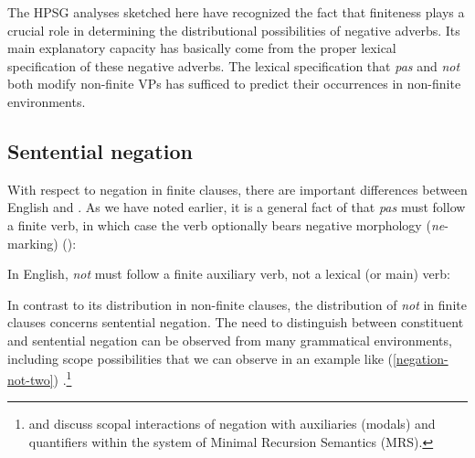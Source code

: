 \documentclass[output=paper
	        ,collection
	        ,collectionchapter
 	        ,biblatex
                ,babelshorthands
                ,newtxmath
                ,draftmode
                ,colorlinks, citecolor=brown
]{langscibook}
\begin{document}
\begin{exe}
\begin{xlist}
\begin{exe}
\begin{xlist}
The HPSG analyses sketched here have recognized
the fact that finiteness plays a crucial role in
determining the distributional possibilities of negative
adverbs. Its main explanatory capacity
has basically come from the proper lexical specification of these negative
adverbs. The lexical specification that \textit{pas} and
\textit{not} both modify non-finite VPs has sufficed to predict their
occurrences in non-finite environments.



\subsection{Sentential negation}
\label{sec-sentential-negation}

With respect to negation in finite clauses, there are important differences between English and .
As we have noted earlier, it is a general fact of  that \textit{pas} must follow a finite verb, in which case the verb optionally bears negative morphology (\textit{ne}-marking) (\citealp[]{KS:02}):

\eal
{}
\zl
\noindent
In English, \textit{not} must follow a finite
auxiliary verb, not a lexical (or main) verb:

\eal
{}
\zl

In contrast to its distribution
in non-finite clauses, the distribution
of \textit{not}
 in finite clauses concerns sentential
 negation.
  The need to distinguish between constituent and sentential negation can be
  observed from
  many grammatical environments, including scope
possibilities that we can observe in an example like (\ref{negation-not-two}) \parencites(see){Klima:64}{Baker:91}{Warner2000a-u}[]{kimmichaelis:2020}.\footnote{\citet{Warner2000a-u} and \citet{BL:13}
discuss scopal interactions of negation with auxiliaries (modals) and quantifiers
within the system of Minimal Recursion Semantics (MRS).}


\end{xlist}
\end{exe}
\end{xlist}
\end{exe}
\end{document}
